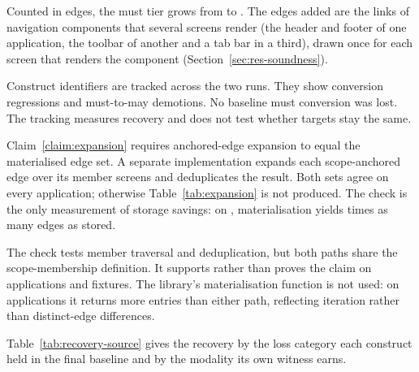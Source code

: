 Counted in edges, the must tier grows from \AttrMustBefore{} to \AttrMustAfter{}.
The edges added are the links of navigation components that several screens render (the header and
footer of one application, the toolbar of another and a tab bar in a third), drawn once for each
screen that renders the component (Section~\ref{sec:res-soundness}).

Construct identifiers are tracked across the two runs. They show \AttrRegressed{} conversion
regressions and \AttrDemoted{} must-to-may demotions. No baseline
must conversion was lost. The tracking measures recovery and does not test whether targets stay
the same.

Claim~\ref{claim:expansion} requires anchored-edge expansion to equal the materialised edge set.
A separate implementation expands each scope-anchored edge over its member screens and
deduplicates the result. Both sets agree on every application; otherwise Table~\ref{tab:expansion}
is not produced. The check is the only measurement of storage savings: on \ExpansionWidest{},
materialisation yields \ExpansionWidestRatio{} times as many edges as stored.

The check tests member traversal and deduplication, but both paths share the scope-membership
definition. It supports rather than proves the claim on \ExpansionApps{} applications and fixtures.
The library's materialisation function is not used: on \ExpansionLibraryLarger{} applications it
returns more entries than either path, reflecting iteration rather than distinct-edge differences.

\begin{table}[t]\small
\caption{The anchored edge set against its expansion.}
\label{tab:expansion}
\TabExpansion
\par{}
\end{table}

Table~\ref{tab:recovery-source} gives the recovery by the loss category each construct held in the final
baseline and by the modality its own witness earns.

\begin{table}[t]\small
\caption{Where recovered constructs came from on the final snapshot.}
\label{tab:recovery-source}
\TabRecoverySource
\par{}
\end{table}


